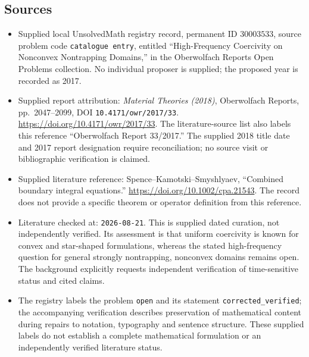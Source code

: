 \documentclass[11pt]{article}
\begin{document}
\subsection{Sources}
\begin{itemize}
\item Supplied local UnsolvedMath registry record, permanent ID \(30003533\), source problem code \texttt{catalogue entry}, entitled ``High-Frequency Coercivity on Nonconvex Nontrapping Domains,'' in the Oberwolfach Reports Open Problems collection. No individual proposer is supplied; the proposed year is recorded as 2017.
\item Supplied report attribution: \emph{Material Theories (2018)}, Oberwolfach Reports, pp.~2047--2099, DOI \texttt{10.4171/owr/2017/33}. \url{https://doi.org/10.4171/owr/2017/33}. The literature-source list also labels this reference ``Oberwolfach Report 33/2017.'' The supplied 2018 title date and 2017 report designation require reconciliation; no source visit or bibliographic verification is claimed.
\item Supplied literature reference: Spence--Kamotski--Smyshlyaev, ``Combined boundary integral equations.'' \url{https://doi.org/10.1002/cpa.21543}. The record does not provide a specific theorem or operator definition from this reference.
\item Literature checked at: \texttt{2026-08-21}. This is supplied dated curation, not independently verified. Its assessment is that uniform coercivity is known for convex and star-shaped formulations, whereas the stated high-frequency question for general strongly nontrapping, nonconvex domains remains open. The background explicitly requests independent verification of time-sensitive status and cited claims.
\item The registry labels the problem \texttt{open} and its statement \texttt{corrected\_verified}; the accompanying verification describes preservation of mathematical content during repairs to notation, typography and sentence structure. These supplied labels do not establish a complete mathematical formulation or an independently verified literature status.
\end{itemize}
\end{document}
